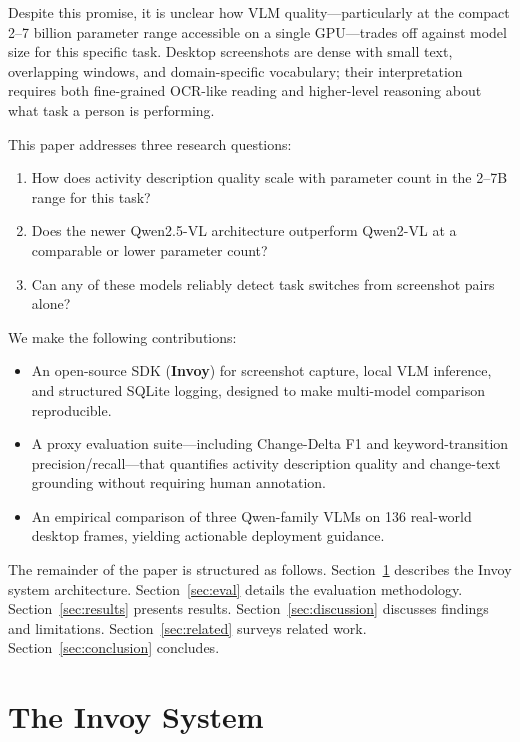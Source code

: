 \documentclass[10pt, twocolumn]{article}
\begin{document}
Despite this promise, it is unclear how VLM quality---particularly at the compact
2--7 billion parameter range accessible on a single GPU---trades off against model
size for this specific task. Desktop screenshots are dense with small text, overlapping
windows, and domain-specific vocabulary; their interpretation requires both fine-grained
OCR-like reading and higher-level reasoning about what task a person is performing.

This paper addresses three research questions:
\begin{enumerate}
  \item[\textbf{RQ1.}] How does activity description quality scale with parameter count
        in the 2--7B range for this task?
  \item[\textbf{RQ2.}] Does the newer Qwen2.5-VL architecture outperform Qwen2-VL at a
        comparable or lower parameter count?
  \item[\textbf{RQ3.}] Can any of these models reliably detect task switches from
        screenshot pairs alone?
\end{enumerate}

We make the following contributions:
\begin{itemize}
  \item An open-source SDK (\textbf{Invoy}) for screenshot capture, local VLM inference,
        and structured SQLite logging, designed to make multi-model comparison
        reproducible.
  \item A proxy evaluation suite---including Change-Delta F1 and keyword-transition
        precision/recall---that quantifies activity description quality and change-text
        grounding without requiring human annotation.
  \item An empirical comparison of three Qwen-family VLMs on 136 real-world desktop
        frames, yielding actionable deployment guidance.
\end{itemize}

The remainder of the paper is structured as follows.
Section~\ref{sec:system} describes the Invoy system architecture.
Section~\ref{sec:eval} details the evaluation methodology.
Section~\ref{sec:results} presents results.
Section~\ref{sec:discussion} discusses findings and limitations.
Section~\ref{sec:related} surveys related work.
Section~\ref{sec:conclusion} concludes.

\section{The Invoy System}
\label{sec:system}
\end{document}
